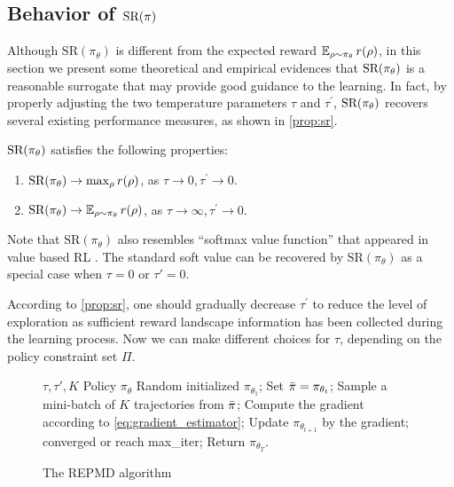 \subsection{Behavior of $\text{SR}(\pi)$}
\label{subsec:sr}
Although $\text{SR}(\pi_\theta)$ is different from the expected reward $\operatorname*{\mathbb{E}}_{\rho \sim \pi_\theta}{r(\rho)}$,  in this section we present some theoretical and empirical evidences that $\text{SR}(\pi_\theta)$ is a reasonable surrogate that may provide good guidance to the learning. 
In fact, by properly adjusting the two temperature parameters $\tau$ and $\tau^{\prime}$, $\text{SR}(\pi_\theta)$ recovers several existing performance measures, as shown in \cref{prop:sr}.
\begin{prop}
\label{prop:sr}
$\text{SR}(\pi_\theta)$ satisfies the following properties:
\begin{enumerate}[label=(\roman*)]
	\item  $\text{SR}(\pi_\theta) \to \max_{\rho}{r(\rho)}$, as $\tau \to 0, \tau^{\prime} \to 0$.
	\item $\text{SR}(\pi_\theta) \to \operatorname*{\mathbb{E}}_{\rho \sim \pi_\theta}{r(\rho)}$, as $\tau \to \infty, \tau^{\prime} \to 0$. 
\end{enumerate}	
\end{prop}
\begin{remk}
	Note that $\text{SR}(\pi_\theta)$ also resembles ``softmax value function'' that appeared in value based RL \citep{nachum2017bridging,haarnoja2018soft,ding2017cold}. The standard soft value can be recovered by $\text{SR}(\pi_\theta)$ as a special case when $\tau = 0$ or $\tau'=0$. 
\end{remk}

According to \cref{prop:sr}, one should gradually decrease $\tau^{\prime}$ to reduce the level of exploration as sufficient reward landscape information has been collected during the learning process. Now we can make different choices for $\tau$, depending on the policy constraint set $\Pi$.

\begin{wrapfigure}{r}{0.56\textwidth}
	\begin{minipage}{0.56\textwidth}
		\begin{algorithm}[H]
			\caption{\label{alg:repmd}  The REPMD algorithm}
			\begin{algorithmic}[1]
				\INPUT $\tau, \tau', K$
				\OUTPUT  Policy $\pi_\theta$
				\STATE Random initialized $\pi_{\theta_1}$;
				\STATE Set $\bar{\pi} = \pi_{\theta_t}$;
				\REPEAT 
				\STATE Sample a mini-batch of $K$ trajectories from $\bar{\pi}$;
				\STATE Compute the gradient according to \cref{eq:gradient_estimator};
				\STATE Update $\pi_{\theta_{t+1}}$ by the gradient;
				\UNTIL converged or reach max\_iter;
				\ENDFOR
				\STATE Return $\pi_{\theta_T}$.
			\end{algorithmic}
		\end{algorithm}
	\end{minipage}
\end{wrapfigure}

